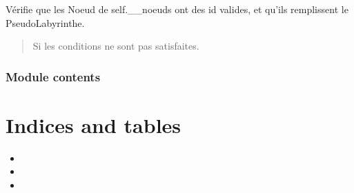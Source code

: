 \documentclass[letterpaper,10pt,french]{sphinxmanual}
\begin{document}
\begin{fulllineitems}
\begin{fulllineitems}
\label{\detokenize{src:src.utilites.PseudoLabyrinthe.verifie_noeuds}}
\pysigstartsignatures
{}
\pysigstopsignatures
\sphinxAtStartPar
Vérifie que les Noeud de self.\_\_noeuds ont des id valides, et qu’ils remplissent
le PseudoLabyrinthe.
\begin{quote}\begin{description}
\sphinxAtStartPar
{} \textendash{} Si les conditions ne sont pas satisfaites.

\end{description}\end{quote}

\end{fulllineitems}


\end{fulllineitems}



\subsection{Module contents}
\label{\detokenize{src:module-src}}\label{\detokenize{src:module-contents}}

\chapter{Indices and tables}
\label{\detokenize{index:indices-and-tables}}\begin{itemize}
\item {} 
\sphinxAtStartPar
{}

\item {} 
\sphinxAtStartPar
{}

\item {} 
\sphinxAtStartPar
{}

\end{itemize}


\renewcommand{\indexname}{Index des modules Python}
\begin{sphinxtheindex}
\let\bigletter\sphinxstyleindexlettergroup
\bigletter{s}
\item\relax{}
\item\relax{}
\item\relax{}
\end{sphinxtheindex}

\renewcommand{\indexname}{Index}
\printindex
\end{document}
